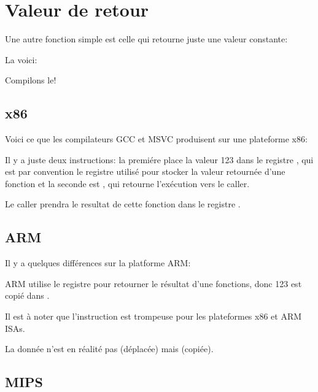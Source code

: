 \section{Valeur de retour}
\label{ret_val_func}

Une autre fonction simple est celle qui retourne juste une valeur constante:

La voici:



Compilons le!

\subsection{x86}

Voici ce que les compilateurs GCC et MSVC produisent sur une plateforme x86:



Il y a juste deux instructions: la premiére place la valeur 123 dans le registre \EAX, qui est par convention le registre utilisé pour stocker la valeur retournée d'une fonction et la seconde est \RET, qui retourne l'exécution vers le \gls{caller}.

Le caller prendra le resultat de cette fonction dans le registre \EAX.

\subsection{ARM}

Il y a quelques différences sur la platforme ARM:



ARM utilise le registre  pour retourner le résultat d'une fonctions, donc 123 est copié dans .


Il est à noter que l'instruction \MOV est trompeuse pour les plateformes x86 et ARM \ac{ISA}s.

La donnée n'est en réalité pas  (déplacée) mais  (copiée).

\subsection{MIPS}

